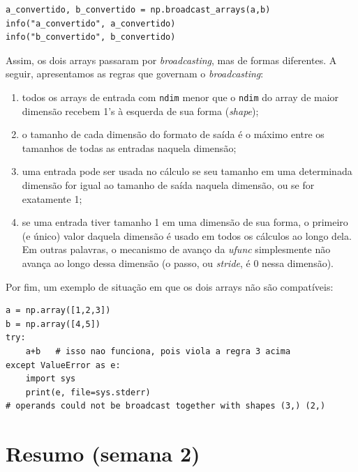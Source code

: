 \documentclass[11pt,a4paper]{article}
\begin{document}
\begin{lstlisting}
a_convertido, b_convertido = np.broadcast_arrays(a,b)
info("a_convertido", a_convertido)
info("b_convertido", b_convertido)
\end{lstlisting}

Assim, os dois arrays passaram por \emph{broadcasting}, mas de formas
diferentes. A seguir, apresentamos as regras que governam o
\emph{broadcasting}:

\begin{enumerate}
\item todos os arrays de entrada com \texttt{ndim} menor que o
  \texttt{ndim} do array de maior dimensão recebem 1's à esquerda de sua
  forma (\emph{shape});
\item o tamanho de cada dimensão do formato de saída é o máximo entre os
  tamanhos de todas as entradas naquela dimensão;
\item uma entrada pode ser usada no cálculo se seu tamanho em uma
  determinada dimensão for igual ao tamanho de saída naquela dimensão,
  ou se for exatamente 1;
\item se uma entrada tiver tamanho 1 em uma dimensão de sua forma, o
  primeiro (e único) valor daquela dimensão é usado em todos os cálculos
  ao longo dela. Em outras palavras, o mecanismo de avanço da
  \emph{ufunc} simplesmente não avança ao longo dessa dimensão (o passo,
  ou \emph{stride}, é 0 nessa dimensão).
\end{enumerate}

Por fim, um exemplo de situação em que os dois arrays não são
compatíveis:

\begin{lstlisting}
a = np.array([1,2,3])
b = np.array([4,5])
try:
    a+b   # isso nao funciona, pois viola a regra 3 acima
except ValueError as e:
    import sys
    print(e, file=sys.stderr)
# operands could not be broadcast together with shapes (3,) (2,)
\end{lstlisting}

\section{Resumo (semana 2)}
\end{document}

